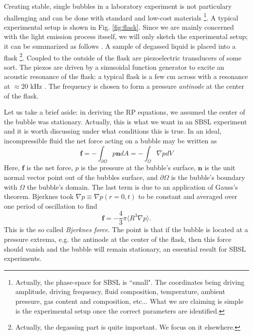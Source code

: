 \documentclass[rmp,aps,nofootinbib,superscriptaddress,floatfix]{revtex4-2}
\begin{document}
Creating stable, single bubbles in a laboratory experiment is not particulary challenging and can be done with standard and low-cost materials \footnote{Actually, the phase-space for SBSL is ``small". The coordinates being driving amplitude, driving frequency, fluid composition, temperature, ambient pressure, gas content and composition, etc... What we are claiming is simple is the experimental setup once the correct parameters are identified.}. A typical experimental setup is shown in Fig. \ref{fig:flask}. Since we are mainly concerned with the light emission process itsself, we will only sketch the experimental setup; it can be summarized as follows \cite{lentz1995mie,gaitan1990experimental,gaitan1992sonoluminescence,gompf2000mie,brenner2002single,yasui2018acoustic,brennen2014cavitation,suslick2008inside}. A sample of degassed liquid is placed into a flask \footnote{Actually, the degassing part is quite important. We focus on it elsewhere.}. Coupled to the outside of the flask are piezoelectric transducers of some sort. The piezos are driven by a sinusoidal function generator to excite an acoustic resonance of the flask: a typical flask is a few cm across with a resonance at $\approx 20$ kHz \cite{brenner2002single}. The frequency is chosen to form a pressure \emph{antinode} at the center of the flask.

Let us take a brief aside: in deriving the RP equations, we assumed the center of the bubble was stationary. Actually, this is what we want in an SBSL experiment and it is worth discussing under what conditions this is true. In an ideal, incompressible fluid the net force acting on a bubble may be written as 
\begin{equation}
    \bm{f}=-\int_{\partial \Omega} p \bm{n} dA = -\int_\Omega \nabla p dV
\end{equation}
Here, $\bm{f}$ is the net force, $p$ is the pressure at the bubble's surface, $\bm{n}$ is the unit normal vector point out of the bubbles surface, and $\partial \Omega$ is the bubble's boundary with $\Omega$ the bubble's domain. The last term is due to an application of Gauss's theorem. Bjerknes \cite{bjerknes1909kraftfelder} took $\nabla p \equiv \nabla p(r=0,t)$ to be constant and averaged over one period of oscillation to find 
\begin{equation}
    \bm{f} = -\frac{4}{3}\pi \langle R^3 \nabla p \rangle.
    \label{eq:Bj_force}
\end{equation}
This is the so called \emph{Bjerknes force}. The point is that if the bubble is located at a pressure extrema, e.g. the antinode at the center of the flask, then this force should vanish and the bubble will remain stationary, an essential result for SBSL experiments.
\end{document}
